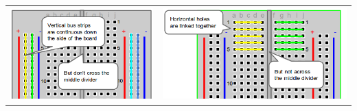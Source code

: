 %

\begin{tabular}{p{} p{}}
	\vspace{0pt} \includegraphics[height=1.4in]{pi_images/verticalpower.png} &
	\vspace{0pt} \includegraphics[height=1.4in]{pi_images/horizontal-rows.png}
\end{tabular}



